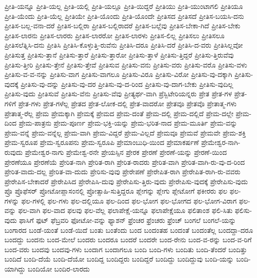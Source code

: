 {ಪ್ರೀತಿ-ಯನ್ನೂ
ಪ್ರೀತಿ-ಯಲ್ಲ
ಪ್ರೀತಿ-ಯಲ್ಲಿ
ಪ್ರೀತಿ-ಯಲ್ಲೂ
ಪ್ರೀತಿ-ಯಿದ್ದರೆ
ಪ್ರೀತಿಯು
ಪ್ರೀತಿ-ಯುಂಟಾಗಲಿ
ಪ್ರೀತಿಯೂ
ಪ್ರೀತಿ-ಯೆಂದು
ಪ್ರೀತಿ-ಯೆಲ್ಲ
ಪ್ರೀತಿಯೇ
ಪ್ರೀತಿ-ಯೊಂದು
ಪ್ರೀತಿ-ಯೊಂದೇ
ಪ್ರೀತಿಸದ
ಪ್ರೀತಿಸದೆ
ಪ್ರೀತಿಸ-ಬಯಸಿ-ದನು
ಪ್ರೀತಿಸ-ಬಲ್ಲ-ವನಾ-ದರೆ
ಪ್ರೀತಿಸ-ಬಲ್ಲಿರಾ
ಪ್ರೀತಿಸ-ಬಲ್ಲಿರಾದರೆ
ಪ್ರೀತಿಸ-ಬಲ್ಲೆವು
ಪ್ರೀತಿಸ-ಬೇಕಾ-ಗಿದೆ
ಪ್ರೀತಿಸ-ಬೇಕು
ಪ್ರೀತಿಸ-ಲಾರನು
ಪ್ರೀತಿಸ-ಲಾರರು
ಪ್ರೀತಿಸ-ಲಾರರೋ
ಪ್ರೀತಿಸ-ಲಾರಳು
ಪ್ರೀತಿಸ-ಲಿಲ್ಲ
ಪ್ರೀತಿಸಲು
ಪ್ರೀತಿಸಲೂ
ಪ್ರೀತಿಸಲೆತ್ನಿಸಿ-ದನು
ಪ್ರೀತಿಸಿ
ಪ್ರೀತಿಸಿ-ಕೊಳ್ಳುತ್ತಿ-ರುವೆನು
ಪ್ರೀತಿಸಿ-ದರೂ
ಪ್ರೀತಿಸಿ-ದರೆ
ಪ್ರೀತಿಸಿ-ದ-ವರು
ಪ್ರೀತಿಸಿಲ್ಲವೋ
ಪ್ರೀತಿಸುತ್ತ
ಪ್ರೀತಿಸು-ತ್ತಾನೆ
ಪ್ರೀತಿಸು-ತ್ತಾರೆ
ಪ್ರೀತಿಸು-ತ್ತಾರೋ
ಪ್ರೀತಿಸು-ತ್ತಾಳೆ
ಪ್ರೀತಿಸು-ತ್ತಿದ್ದರೆ
ಪ್ರೀತಿಸು-ತ್ತಿರುವೆವು
ಪ್ರೀತಿಸು-ತ್ತೀರಿ
ಪ್ರೀತಿಸು-ತ್ತೇನೆ
ಪ್ರೀತಿಸು-ತ್ತೇವೆ
ಪ್ರೀತಿಸುವ
ಪ್ರೀತಿಸು-ವನು
ಪ್ರೀತಿಸು-ವರು
ಪ್ರೀತಿಸು-ವರೊ
ಪ್ರೀತಿಸು-ವಳು
ಪ್ರೀತಿಸು-ವ-ವ-ನನ್ನು
ಪ್ರೀತಿಸು-ವಾಗ
ಪ್ರೀತಿಸು-ವಾಗಲೂ
ಪ್ರೀತಿಸು-ವಿರೂ
ಪ್ರೀತಿಸು-ವಿರೋ
ಪ್ರೀತಿಸು-ವು-ದಕ್ಕಾಗಿ
ಪ್ರೀತಿಸು-ವುದಕ್ಕೆ
ಪ್ರೀತಿಸು-ವು-ದನ್ನು
ಪ್ರೀತಿಸು-ವು-ದರ
ಪ್ರೀತಿಸು-ವು-ದ-ರಿಂದ
ಪ್ರೀತಿಸು-ವು-ದಾಗ-ಬೇಕು
ಪ್ರೀತಿಸು-ವುದಿಲ್ಲ
ಪ್ರೀತಿಸು-ವುದು
ಪ್ರೀತಿಸುವೆ
ಪ್ರೀತಿಸು-ವೆನು
ಪ್ರೀತಿಸು-ವೆವು
ಪ್ರೀತ್ಯರ್ಥ-ವಾಗಿ
ಪ್ರೆಸ್ಬಿಟೇರಿಯನ್ನರು
ಪ್ರೇತ
ಪ್ರೇತ-ಗಳ
ಪ್ರೇತ-ಗಳಿಗೆ
ಪ್ರೇತ-ಗಳು
ಪ್ರೇತ-ಗಳೆಲ್ಲ
ಪ್ರೇತದ
ಪ್ರೇತ-ಲೋಕ-ದಲ್ಲಿ
ಪ್ರೇತ-ವಾದರೋ
ಪ್ರೇತವೂ
ಪ್ರೇತವೊ
ಪ್ರೇತಾತ್ಮ-ಗಳು
ಪ್ರೇತಾತ್ಮ-ರೆಲ್ಲ
ಪ್ರೇಮ
ಪ್ರೇಮಕ್ಕಾಗಿ
ಪ್ರೇಮಕ್ಕೆ
ಪ್ರೇಮದ
ಪ್ರೇಮ-ದಂತೆ
ಪ್ರೇಮ-ದಲ್ಲಿ
ಪ್ರೇಮ-ದಲ್ಲಿದೆ
ಪ್ರೇಮ-ದಲ್ಲೇ
ಪ್ರೇಮ-ದಿಂದ
ಪ್ರೇಮ-ಪಾತ್ರನು
ಪ್ರೇಮ-ಪೂರ್ಣ
ಪ್ರೇಮ-ಭಕ್ತಿ-ಯನ್ನು
ಪ್ರೇಮ-ಭರಿತ-ನಾದ
ಪ್ರೇಮ-ಮೂರ್ತಿ
ಪ್ರೇಮ-ವನ್ನು
ಪ್ರೇಮ-ವನ್ನೆ
ಪ್ರೇಮ-ವನ್ನೆಲ್ಲ
ಪ್ರೇಮ-ವಾಗಿ
ಪ್ರೇಮ-ವಿದ್ದರೆ
ಪ್ರೇಮ-ವಿಲ್ಲದೆ
ಪ್ರೇಮವೂ
ಪ್ರೇಮವೆ
ಪ್ರೇಮವೇ
ಪ್ರೇಮ-ಶಕ್ತಿ
ಪ್ರೇಮ-ಸ್ವರೂಪ
ಪ್ರೇಮ-ಸ್ವರೂಪನು
ಪ್ರೇಮ-ಸ್ವರೂಪಿ
ಪ್ರೇಮಾಂಬುಧಿ-ಯಿಂದ
ಪ್ರೇಮಾಕರ್ಷಣೆ
ಪ್ರೇಮೇಶ್ವರ-ನಾಗಿ-ರುವುದು
ಪ್ರೇಮೇಶ್ವರ-ನಾಗು
ಪ್ರೇಮೇಶ್ವ-ರನೇ
ಪ್ರೇಯಸ್ಸಿನ
ಪ್ರೇರಕ
ಪ್ರೇರಣೆ
ಪ್ರೇರಣೆ-ಯನ್ನು
ಪ್ರೇರಣೆ-ಯಿಂದ
ಪ್ರೇರಣೆಯೂ
ಪ್ರೇರಣೆಯೆ
ಪ್ರೇರಿತ-ನಾಗಿ
ಪ್ರೇರಿತ-ರಾಗಿ
ಪ್ರೇರಿತ-ರಾದರು
ಪ್ರೇರಿತ-ವಾಗಿ
ಪ್ರೇರಿತ-ವಾಗಿ-ರು-ವು-ದ-ರಿಂದ
ಪ್ರೇರಿತ-ವಾದು-ದಲ್ಲ
ಪ್ರೇರಿತ-ವಾ-ದುದು
ಪ್ರೇರಿಸು-ವುವು
ಪ್ರೇರೇಪಣೆ
ಪ್ರೇರೇಪಿತ-ರಾಗಿ
ಪ್ರೇರೇಪಿತ-ರಾಗಿ-ರು-ವವರು
ಪ್ರೇರೇಪಿಸ-ಬೇಕಾದರೆ
ಪ್ರೇರೇಪಿಸಿದ
ಪ್ರೇರೇಪಿಸಿ-ದುವು
ಪ್ರೇರೇಪಿಸು-ತ್ತಿರು-ವುದು
ಪ್ರೇರೇಪಿಸು-ವುದಕ್ಕೆ
ಪ್ರೇರೇಪಿಸು-ವುದು
ಪ್ರೊ
ಪ್ರೊಫೆಸರ್
ಪ್ರೋಟೋಪ್ಲಾಸಂನಲ್ಲಿ
ಪ್ರೋತ್ಸಾಹಿ-ಸುತ್ತಿದ್ದರೂ
ಪ್ಲೇಗನ್ನು
ಪ್ಲೇಗು
ಪ್ಲೇಟೋಗೆ
ಫಕೀರರು
ಫಲ
ಫಲ-ಗಳನ್ನು
ಫಲ-ಗಳಲ್ಲಿ
ಫಲ-ಗಳು
ಫಲ-ದಲ್ಲಿಯೂ
ಫಲ-ದಿಂದ
ಫಲ-ಭೋಗ
ಫಲ-ಭೋಗದ
ಫಲ-ಭೋಗ-ವಿರಾಗ
ಫಲ-ವನ್ನು
ಫಲ-ವಾಗಿ
ಫಲ-ವಾದ
ಫಲವು
ಫಲ-ವೆಲ್ಲ
ಫಲಾಪೇಕ್ಷೆ-ಯನ್ನೂ
ಫಲಾಪೇಕ್ಷೆಯೂ
ಫಲಿತಾಂಶ
ಫಲಿ-ಸಿತು
ಫಲಿಸು-ವುದು
ಫಾಸಿಗೆ
ಫುಟ್
ಫೆಬ್ರವರಿ
ಫೋಟೋ-ವನ್ನು
ಫ್ಯಾಶನ್
ಫ್ರೆಂಚರ
ಫ್ರೆಂಚರು
ಫ್ರೆಂಚ್
ಬಂಗಲೆ
ಬಂಗಲೆ-ಯನ್ನು
ಬಂಗಾರದ
ಬಂಡೆ-ಯಂತೆ
ಬಂಡೆ-ಯಿದೆ
ಬಂತು
ಬಂತೆಂದು
ಬಂದ
ಬಂದಂತಹ
ಬಂದಂತೆ
ಬಂದಂತೆಲ್ಲ
ಬಂದದ್ದಾ-ದರೂ
ಬಂದದ್ದು
ಬಂದನು
ಬಂದ-ಮೇಲೆ
ಬಂದರು
ಬಂದರೂ
ಬಂದರೆ
ಬಂದರೇ
ಬಂದ-ರೇನು
ಬಂದ-ವ-ರನ್ನು
ಬಂದ-ವ-ರಿಗೆ
ಬಂದ-ವರು
ಬಂದವು
ಬಂದವು-ಗಳು
ಬಂದಾಗ
ಬಂದಾಗಲೂ
ಬಂದಿ
ಬಂದಿ-ಗಳು
ಬಂದಿತು
ಬಂದಿ-ತೆಂದರೆ
ಬಂದಿತ್ತು
ಬಂದಿದೆ
ಬಂದಿ-ದೆಯೆ
ಬಂದಿ-ದೆಯೋ
ಬಂದಿದ್ದ
ಬಂದಿದ್ದರು
ಬಂದಿದ್ದರೆ
ಬಂದಿದ್ದು
ಬಂದಿದ್ದುವು
ಬಂದಿ-ಯನ್ನು
ಬಂದಿ-ಯಾಗಿದ್ದು
ಬಂದಿಯೋ
ಬಂದಿರ-ಲಾರದು
}
